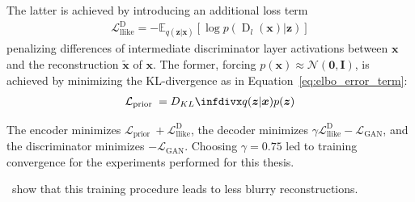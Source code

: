 The latter is achieved by introducing an additional loss term
\begin{align}
    \mathcal{L}_{\text {llike}}^{\text {D}}=-\mathbb{E}_{q(\bm{z} | \bm{x})}\left[\log p\left(\operatorname{D}_{l}(\bm{x}) | \bm{z}\right)\right]
\end{align}
penalizing differences of intermediate discriminator layer activations between $\bm{x}$ and the reconstruction $\tilde{\bm{x}}$ of $\bm{x}$.
The former, forcing $p(\bm{x}) \approx \mathcal{N}(\bm{0},\bm{I})$, is achieved by minimizing the \ac{KL}-divergence as in Equation~\ref{eq:elbo_error_term}:
\begin{align}
    \mathcal{L}_{\text {prior }}=\kldiv{q(\boldsymbol{z} | \boldsymbol{x})}{p(\boldsymbol{z})}
\end{align}

The encoder minimizes $\mathcal{L}_{\text {prior }} +  \mathcal{L}_{\text {llike}}^{\text {D}}$, the decoder minimizes $\gamma \mathcal{L}_{\text {llike}}^{\text {D}} - \mathcal{L}_\mathrm{GAN}$, and the discriminator minimizes $-\mathcal{L}_\mathrm{GAN}$.
Choosing $\gamma = 0.75$ led to training convergence for the experiments performed for this thesis.

\citet{larsen2015autoencoding}~show that this training procedure leads to less blurry reconstructions.

